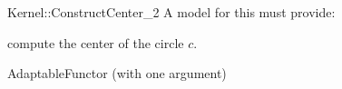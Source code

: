 \begin{ccRefFunctionObjectConcept}{Kernel::ConstructCenter_2}
A model for this must provide:


 {compute the center of the circle $c$.}

\ccRefines
AdaptableFunctor (with one argument)

\ccSeeAlso
{} \\

\end{ccRefFunctionObjectConcept}
